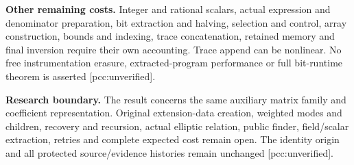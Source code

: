 \documentclass[10pt]{article}
\begin{document}
\textbf{Other remaining costs.} Integer and rational scalars, actual expression
and denominator preparation, bit extraction and halving, selection and control,
array construction, bounds and indexing, trace concatenation, retained memory
and final inversion require their own accounting. Trace append can be
nonlinear. No free instrumentation erasure, extracted-program performance or
full bit-runtime theorem is asserted [pcc:unverified].

\textbf{Research boundary.} The result concerns the same auxiliary matrix
family and coefficient representation. Original extension-data creation,
weighted modes and children, recovery and recursion, actual elliptic relation,
public finder, field/scalar extraction, retries and complete expected cost
remain open. The identity origin and all protected source/evidence histories
remain unchanged [pcc:unverified].
\end{document}
